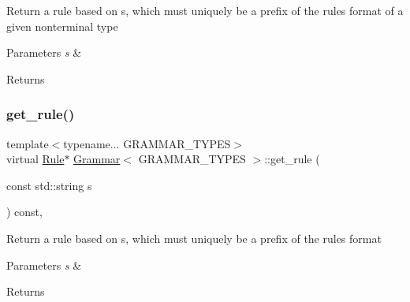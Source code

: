 Return a rule based on s, which must uniquely be a prefix of the rule\textquotesingle{}s format of a given nonterminal type 
\begin{DoxyParams}{Parameters}
{\em s} & \\
\hline
\end{DoxyParams}
\begin{DoxyReturn}{Returns}

\end{DoxyReturn}
\mbox{\label{class_grammar_a1a48e2e6b4757c3398c60a20d759d307}} 
\subsubsection{\texorpdfstring{get\+\_\+rule()}{get\_rule()}\hspace{0.1cm}{\footnotesize\ttfamily [4/4]}}
{\footnotesize\ttfamily template$<$typename... G\+R\+A\+M\+M\+A\+R\+\_\+\+T\+Y\+P\+ES$>$ \\
virtual \hyperlink{class_rule}{Rule}$\ast$ \hyperlink{class_grammar}{Grammar}$<$ G\+R\+A\+M\+M\+A\+R\+\_\+\+T\+Y\+P\+ES $>$\+::get\+\_\+rule (\begin{DoxyParamCaption}\item[{const std\+::string}]{s }\end{DoxyParamCaption}) const\hspace{0.3cm}{\ttfamily [inline]}, {\ttfamily [virtual]}}

Return a rule based on s, which must uniquely be a prefix of the rule\textquotesingle{}s format 
\begin{DoxyParams}{Parameters}
{\em s} & \\
\hline
\end{DoxyParams}
\begin{DoxyReturn}{Returns}

\end{DoxyReturn}
\mbox{\label{class_grammar_a9ec7418e0263e2ade2340e248c04275d}} 
